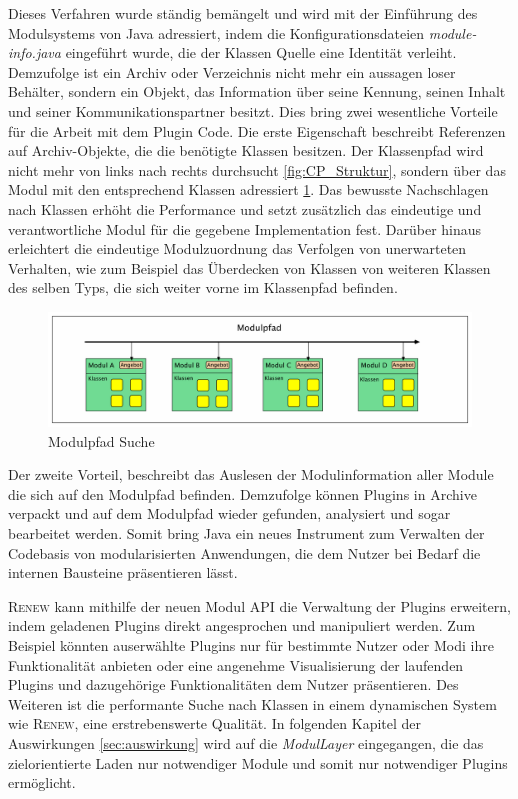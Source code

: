 		Dieses Verfahren wurde ständig bemängelt und wird mit der Einführung des Modulsystems von Java adressiert, indem die Konfigurationsdateien \textit{module-info.java} eingeführt wurde, die der Klassen Quelle eine Identität verleiht. Demzufolge ist ein Archiv oder Verzeichnis nicht mehr ein aussagen loser Behälter, sondern ein Objekt, das Information über seine Kennung, seinen Inhalt und seiner Kommunikationspartner besitzt.\newline
		Dies bring zwei wesentliche Vorteile für die Arbeit mit dem Plugin Code. Die erste Eigenschaft beschreibt Referenzen auf Archiv-Objekte, die die benötigte Klassen besitzen. Der Klassenpfad wird nicht mehr von links nach rechts durchsucht \ref{fig:CP_Struktur}, sondern über das Modul mit den entsprechend Klassen adressiert \ref{fig:MP_Struktur}. \newline
		Das bewusste Nachschlagen nach Klassen erhöht die Performance und setzt zusätzlich das eindeutige und verantwortliche Modul für die gegebene Implementation fest. Darüber hinaus erleichtert die eindeutige Modulzuordnung das Verfolgen von unerwarteten Verhalten, wie zum Beispiel das Überdecken von Klassen von weiteren Klassen des selben Typs, die sich weiter vorne im Klassenpfad befinden.\bigbreak 
		\begin{figure}[h!]
		  \centering
		  \includegraphics[width=\textwidth]{material/images/Modulpfad.pdf}
		  \caption{Modulpfad Suche}
		  \label{fig:MP_Struktur}
		\end{figure}
		Der zweite Vorteil, beschreibt das Auslesen der Modulinformation aller Module die sich auf den Modulpfad befinden. Demzufolge können Plugins in Archive verpackt und auf dem Modulpfad wieder gefunden, analysiert und sogar bearbeitet werden. Somit bring Java ein neues Instrument zum Verwalten der Codebasis von modularisierten Anwendungen, die dem Nutzer bei Bedarf die internen Bausteine präsentieren lässt.\bigbreak

		\textsc{Renew} kann mithilfe der neuen Modul API die Verwaltung der Plugins erweitern, indem geladenen Plugins direkt angesprochen und manipuliert werden. Zum Beispiel könnten auserwählte Plugins nur für bestimmte Nutzer oder Modi ihre Funktionalität anbieten oder eine angenehme Visualisierung der laufenden Plugins und dazugehörige Funktionalitäten dem Nutzer präsentieren. Des Weiteren ist die performante Suche nach Klassen in einem dynamischen System wie \textsc{Renew}, eine erstrebenswerte Qualität.  \newline
		In folgenden Kapitel der Auswirkungen \ref{sec:auswirkung} wird auf die \textit{ModulLayer} eingegangen, die das zielorientierte Laden nur notwendiger Module und somit nur notwendiger Plugins ermöglicht.

